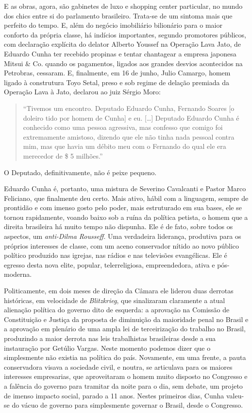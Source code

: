 E as obras, agora, são gabinetes de luxo e shopping center particular,
no mundo dos chics entre si do parlamento brasileiro. Trata-se de um
sintoma mais que perfeito do tempo. E, além do negócio imobiliário
bilionário para o maior conforto da própria classe, há indícios
importantes, segundo promotores públicos, com declaração explícita do
delator Alberto Youssef na Operação Lava Jato, de Eduardo Cunha ter
recebido propinas e tentar chantagear a empresa japonesa Mitsui \& Co.
quando os pagamentos, ligados aos grandes desvios acontecidos na
Petrobras, cessaram. E, finalmente, em 16 de junho, Julio Camargo, homem
ligado à construtura Toyo Setal, preso e sob regime de delação premiada
da Operação Lava à Jato, declarou ao juiz Sérgio Moro:

\begin{quote}
``Tivemos um encontro. Deputado Eduardo Cunha, Fernando Soares {[}o
doleiro tido por homem de Cunha{]} e eu. {[}…{]} Deputado Eduardo
Cunha é conhecido como uma pessoa agressiva, mas confesso que comigo foi
extremamente amistoso, dizendo que ele não tinha nada pessoal contra
mim, mas que havia um débito meu com o Fernando do qual ele era
merecedor de \$ 5 milhões.''
\end{quote}

O Deputado, definitivamente, não é peixe pequeno.

Eduardo Cunha é, portanto, uma mistura de Severino Cavalcanti e Pastor
Marco Feliciano, que finalmente deu certo. Mais ativo, hábil com a
linguagem, sempre de prontidão e com imenso gosto pelo poder, mais
estruturado em sua bases, ele se tornou rapidamente, voando baixo sob a
ruína da política petista, o homem que a direita brasileira há muito
tempo não dispunha. Ele é de fato, sobre todos os aspectos, um
\emph{anti-Dilma Rousseff}. Uma verdadeira liderança, produtiva para os
próprios interesses de classe, com um aceno conservador nítido ao novo
público político produzido nas igrejas, nas rádios e nas televisões
evangélicas. Ele é egresso desta nova elite, popular, telerreligiosa,
empreendedora, ativa e pós-moderna.

Politicamente, em dois meses de direção da Câmara ele liderou duas
derrotas históricas, em velocidade de \emph{Blitzkrieg}, que sinalizaram
claramente a atual alienação política do governo dito de esquerda: a
aprovação na Comissão de Constituição e Justiça da proposta de
diminuição da maioridade penal no Brasil e a aprovação em plenário de
uma ampla lei de terceirização do trabalho no Brasil, produzindo a maior
derrota nas leis trabalhistas brasileiras desde a sua instauração por
Getúlio Vargas. Neste momento podemos dizer que o  simplesmente não
existia na política do país. Novamente, em uma frente, a pauta
conservadora visava a sociedade civil, e noutra, se articulava para os
maiores interesses empresarias, que aproveitaram o homem muito disposto
no Congresso e a falência do governo para tramitar da noite para o dia,
sem debate, um projeto de imenso impacto social, parado a 11 anos.
Nestes primeiros dias, Cunha valeu-se do vácuo de governo para
simplesmente governar o Brasil, desde o Congresso.

